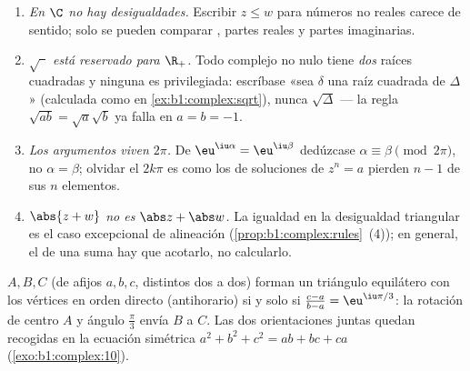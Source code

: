 \begin{remark}\label{rem:b1:complex:pitfalls}
\begin{enumerate}
  \item \emph{En $\C$ no hay desigualdades.} Escribir $z \leq w$ para
        números no reales carece de sentido; solo se pueden comparar
        , partes reales y partes imaginarias.
  \item \emph{$\sqrt{\phantom z}$ está reservado para $\R_+$.} Todo
        complejo no nulo tiene \emph{dos} raíces cuadradas y ninguna es
        privilegiada: escríbase «sea $\delta$ una raíz cuadrada de
        $\Delta$» (calculada como en \cref{ex:b1:complex:sqrt}), nunca
        $\sqrt\Delta$ --- la regla $\sqrt{ab} = \sqrt a\sqrt b$ ya
        falla en $a = b = -1$.
  \item \emph{Los argumentos viven  $2\pi$.} De
        $\eu^{\iu\alpha} = \eu^{\iu\beta}$ dedúzcase $\alpha
        \equiv \beta \pmod{2\pi}$, no $\alpha = \beta$; olvidar el
        $2k\pi$ es como los  de soluciones de $z^n = a$
        pierden $n - 1$ de sus $n$ elementos.
  \item \emph{$\abs{z + w}$ no es $\abs z + \abs w$.} La igualdad en la
        desigualdad triangular es el caso excepcional de alineación
        (\cref{prop:b1:complex:rules}~(4)); en general, el  de una
        suma hay que acotarlo, no calcularlo.
\end{enumerate}
\end{remark}

\begin{example}\label{ex:b1:complex:equilateral}
$A, B, C$ (de afijos $a, b, c$, distintos dos a dos) forman un
triángulo equilátero con los vértices en orden directo (antihorario) si
y solo si $\frac{c - a}{b - a} = \eu^{\iu\pi/3}$: la rotación de centro
$A$ y ángulo $\frac\pi3$ envía $B$ a $C$. Las dos orientaciones juntas
quedan recogidas en la ecuación simétrica $a^2 + b^2 + c^2 = ab + bc +
ca$ (\cref{exo:b1:complex:10}).
\end{example}

